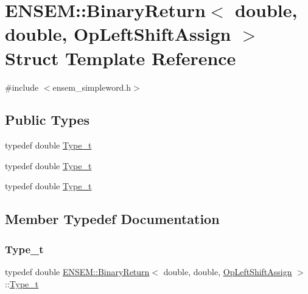 \hypertarget{structENSEM_1_1BinaryReturn_3_01double_00_01double_00_01OpLeftShiftAssign_01_4}{}\section{E\+N\+S\+EM\+:\+:Binary\+Return$<$ double, double, Op\+Left\+Shift\+Assign $>$ Struct Template Reference}
\label{structENSEM_1_1BinaryReturn_3_01double_00_01double_00_01OpLeftShiftAssign_01_4}


{\ttfamily \#include $<$ensem\+\_\+simpleword.\+h$>$}

\subsection*{Public Types}
\begin{DoxyCompactItemize}
\item 
typedef double \mbox{\hyperlink{structENSEM_1_1BinaryReturn_3_01double_00_01double_00_01OpLeftShiftAssign_01_4_afd8f7fe1e9c353d307a21e9b6f2e7970}{Type\+\_\+t}}
\item 
typedef double \mbox{\hyperlink{structENSEM_1_1BinaryReturn_3_01double_00_01double_00_01OpLeftShiftAssign_01_4_afd8f7fe1e9c353d307a21e9b6f2e7970}{Type\+\_\+t}}
\item 
typedef double \mbox{\hyperlink{structENSEM_1_1BinaryReturn_3_01double_00_01double_00_01OpLeftShiftAssign_01_4_afd8f7fe1e9c353d307a21e9b6f2e7970}{Type\+\_\+t}}
\end{DoxyCompactItemize}


\subsection{Member Typedef Documentation}
\mbox{\label{structENSEM_1_1BinaryReturn_3_01double_00_01double_00_01OpLeftShiftAssign_01_4_afd8f7fe1e9c353d307a21e9b6f2e7970}} 
\subsubsection{\texorpdfstring{Type\_t}{Type\_t}\hspace{0.1cm}{\footnotesize\ttfamily [1/3]}}
{\footnotesize\ttfamily typedef double \mbox{\hyperlink{structENSEM_1_1BinaryReturn}{E\+N\+S\+E\+M\+::\+Binary\+Return}}$<$ double, double, \mbox{\hyperlink{structENSEM_1_1OpLeftShiftAssign}{Op\+Left\+Shift\+Assign}} $>$\+::\mbox{\hyperlink{structENSEM_1_1BinaryReturn_3_01double_00_01double_00_01OpLeftShiftAssign_01_4_afd8f7fe1e9c353d307a21e9b6f2e7970}{Type\+\_\+t}}}

